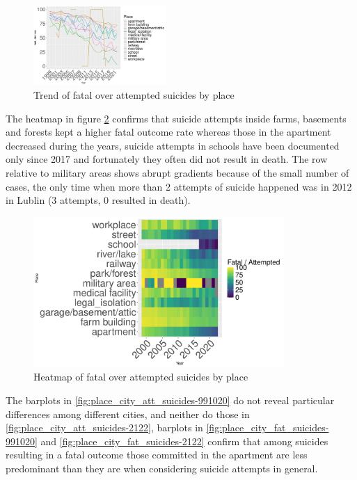 \documentclass{article}
\begin{document}
\begin{figure}[H]
    \centering
    \includegraphics[width=0.45\textwidth]{imgs/place_foa.pdf}
    \caption{Trend of fatal over attempted suicides by place }
    \label{fig:place_foa}
\end{figure}
%
%
The heatmap in figure \ref{fig:place_foa_heat} confirms that 
suicide attempts inside farms, basements and forests kept a higher fatal outcome
rate whereas those in the apartment decreased during the years, suicide attempts in schools
have been documented only since 2017 and fortunately they often did not result in death.
The row relative to military areas shows abrupt gradients because of the small number of cases,
the only time when more than 2 attempts of suicide happened was in 2012 in Lublin (3 attempts, 0 resulted
in death).
%
%
\begin{figure}[H]
    \centering
    \includegraphics[width=0.85\textwidth]{imgs/place_foa_heat.pdf}
    \caption{Heatmap of fatal over attempted suicides by place }
    \label{fig:place_foa_heat}
\end{figure}
%
%
The barplots in \ref{fig:place_city_att_suicides-991020}
do not reveal particular differences among different cities,
and neither do those in \ref{fig:place_city_att_suicides-2122},
barplots in \ref{fig:place_city_fat_suicides-991020} and \ref{fig:place_city_fat_suicides-2122}
confirm that among suicides resulting in a fatal outcome those committed in the apartment
are less predominant than they are when considering suicide attempts in general.
\end{document}
